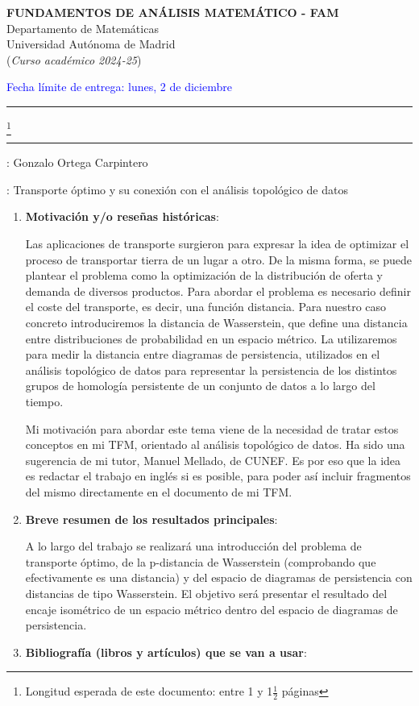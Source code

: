\documentclass[11pt,a4paper,draft]{article}
\newcommand{\blue}{\textcolor{blue}}
\begin{document}
\begin{center}{\bf FUNDAMENTOS DE ANÁLISIS MATEMÁTICO - FAM}  \\
Departamento de Matemáticas\\
Universidad Autónoma de Madrid\\
({\it Curso académico 2024-25})
\end{center}
\hfill \blue{\small Fecha límite de entrega: lunes, 2 de diciembre}
\vskip 6pt \hrule

\vskip 3mm
 \footnote{Longitud esperada de este documento:  entre 1 y 1$\frac 12$ páginas }
\vskip 3mm \hrule

\vskip 5mm

: Gonzalo Ortega Carpintero

\vskip 5mm

: Transporte óptimo y su conexión con el análisis topológico de datos



\vskip 1cm

\begin{enumerate}

\item[1.-] {\bf  Motivación y/o reseñas históricas}:

Las aplicaciones de transporte surgieron para expresar la idea de optimizar el proceso de transportar tierra de un lugar a otro. De la misma forma, se puede plantear el problema como la optimización de la distribución de oferta y demanda de diversos productos. Para abordar el problema es necesario definir el coste del transporte, es decir, una función distancia. Para nuestro caso concreto introduciremos la distancia de Wasserstein, que define una distancia entre distribuciones de probabilidad en un espacio métrico. La utilizaremos para medir la distancia entre diagramas de persistencia, utilizados en el análisis topológico de datos para representar la persistencia de los distintos grupos de homología persistente de un conjunto de datos a lo largo del tiempo.

Mi motivación para abordar este tema viene de la necesidad de tratar estos conceptos en mi TFM, orientado al análisis topológico de datos. Ha sido una sugerencia de mi tutor, Manuel Mellado, de CUNEF. Es por eso que la idea es redactar el trabajo en inglés si es posible, para poder así incluir fragmentos del mismo directamente en el documento de mi TFM.

\item[2.-] {\bf Breve resumen de los resultados principales}:

A lo largo del trabajo se realizará una introducción del problema de transporte óptimo, de la p-distancia de Wasserstein (comprobando que efectivamente es una distancia) y del espacio de diagramas de persistencia con distancias de tipo Wasserstein. El objetivo será presentar el resultado del encaje isométrico de un espacio métrico dentro del espacio de diagramas de persistencia.

\item[3.-] {\bf Bibliografía (libros y artículos) que se van a usar}: 
\end{enumerate}
\end{document}
